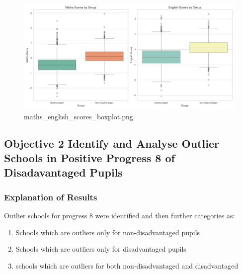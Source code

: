 \documentclass[
  letterpaper,
  DIV=11,
  numbers=noendperiod]{scrartcl}
\begin{document}
\begin{figure}[H]

{\centering \includegraphics{P4DS_A2_Data_Analysis_Project_files/figure-pdf/cell-191-2-maths_english_scores_boxplot.png}

}

\caption{maths\_english\_scores\_boxplot.png}

\end{figure}%

\subsection{Objective 2 Identify and Analyse Outlier Schools in Positive
Progress 8 of Disadavantaged
Pupils}\label{objective-2-identify-and-analyse-outlier-schools-in-positive-progress-8-of-disadavantaged-pupils}

\subsubsection{Explanation of Results}\label{explanation-of-results}

Outlier schools for progress 8 were identified and then further
categories as:

\begin{enumerate}
\def\labelenumi{\alph{enumi})}
\item
  Schools which are outliers only for non-disadvantaged pupils
\item
  Schools which are outliers only for disadvantaged pupils
\item
  schools which are outliers for both non-disadvantaged and
  disadvantaged
\end{enumerate}
\end{document}
